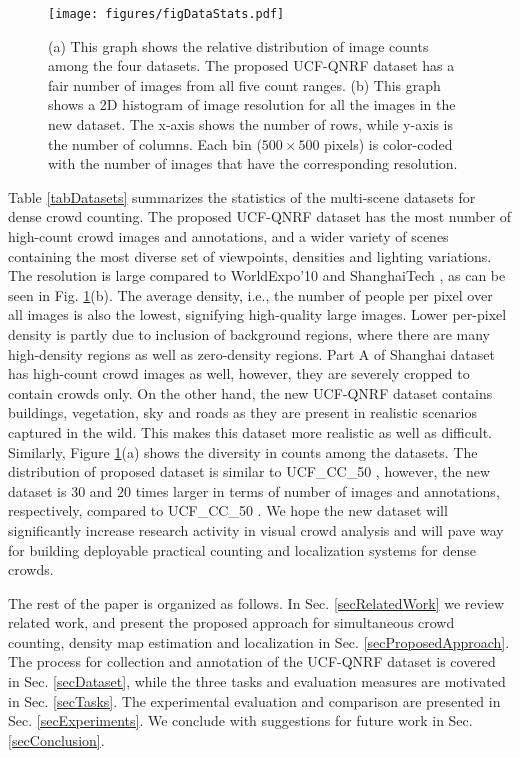 \documentclass[runningheads]{llncs}
\begin{document}
\begin{figure}[t]
\centering
\texttt{[image: figures/figDataStats.pdf]}
\caption{{(a) This graph shows the relative distribution of image counts among the four datasets. The proposed UCF-QNRF dataset has a fair number of images from all five count ranges. (b) This graph shows a 2D histogram of image resolution for all the images in the new dataset. The x-axis shows the number of rows, while y-axis is the number of columns. Each bin ($500 \times 500$ pixels) is color-coded with the number of images that have the corresponding resolution.}}
\label{figDatasetStats}
\end{figure}

Table \ref{tabDatasets} summarizes the statistics of the multi-scene datasets for dense crowd counting. The proposed UCF-QNRF dataset has the most number of high-count crowd images and annotations, and a wider variety of scenes containing the most diverse set of viewpoints, densities and lighting variations. The resolution is large compared to WorldExpo'10 \cite{zhang2015cross} and ShanghaiTech \cite{zhang2016single}, as can be seen in Fig. \ref{figDatasetStats}(b). The average density, i.e., the number of people per pixel over all images is also the lowest, signifying high-quality large images. Lower per-pixel density is partly due to inclusion of background regions, where there are many high-density regions as well as zero-density regions. Part A of Shanghai dataset has high-count crowd images as well, however, they are severely cropped to contain crowds only. On the other hand, the new UCF-QNRF dataset contains buildings, vegetation, sky and roads as they are present in realistic scenarios captured in the wild. This makes this dataset more realistic as well as difficult. Similarly, Figure \ref{figDatasetStats}(a) shows the diversity in counts among the datasets. The distribution of proposed dataset is similar to UCF\_CC\_50 \cite{idrees2013multi}, however, the new dataset is $30$ and $20$ times larger in terms of number of images and annotations, respectively, compared to UCF\_CC\_50 \cite{idrees2013multi}. We hope the new dataset will significantly increase research activity in visual crowd analysis and will pave way for building deployable practical counting and localization systems for dense crowds.

The rest of the paper is organized as follows. In Sec. \ref{secRelatedWork} we review related work, and present the proposed approach for simultaneous crowd counting, density map estimation and localization in Sec. \ref{secProposedApproach}. The process for collection and annotation of the UCF-QNRF dataset is covered in Sec. \ref{secDataset}, while the three tasks and evaluation measures are motivated in Sec. \ref{secTasks}. The experimental evaluation and comparison are presented in Sec. \ref{secExperiments}. We conclude with suggestions for future work in Sec. \ref{secConclusion}.
\end{document}
